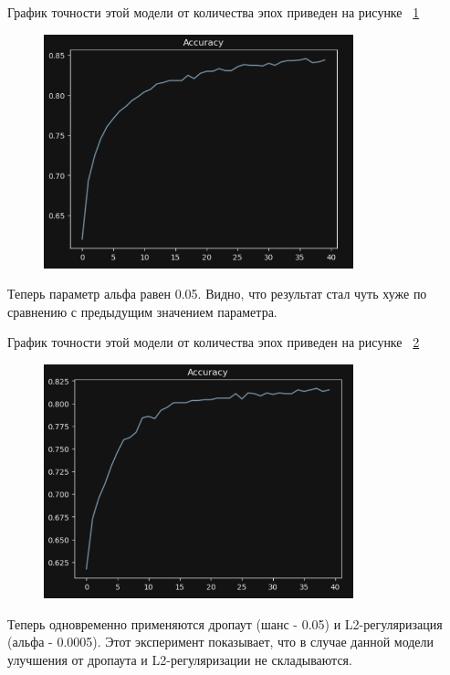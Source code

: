 \documentclass[a4paper, 14pt]{extarticle}
\begin{document}
График точности этой модели от количества эпох приведен на рисунке ~\ref{fig:img5}

\begin{figure}[H]
\centering
\includegraphics[width=0.8\textwidth]{images/res5.png}
\caption{}
\label{fig:img5}
\end{figure}


Теперь параметр альфа равен 0.05. Видно, что результат стал чуть хуже по сравнению с предыдущим значением параметра.

График точности этой модели от количества эпох приведен на рисунке ~\ref{fig:img6}

\begin{figure}[H]
\centering
\includegraphics[width=0.8\textwidth]{images/res6.png}
\caption{}
\label{fig:img6}
\end{figure}

Теперь одновременно применяются дропаут (шанс - 0.05) и L2-регуляризация (альфа - 0.0005). Этот эксперимент показывает, что в случае данной модели улучшения от дропаута и L2-регуляризации не складываются.
\end{document}

